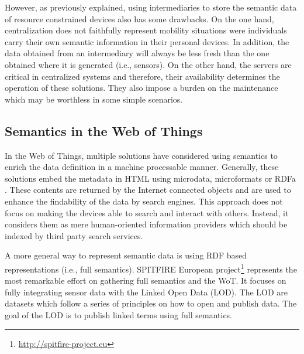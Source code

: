 However, as previously explained, using intermediaries to store the semantic data of resource constrained devices also has some drawbacks.
On the one hand, centralization does not faithfully represent mobility situations were individuals carry their own semantic information in their personal devices.
In addition, the data obtained from an intermediary will always be less fresh than the one obtained where it is generated (i.e., sensors).
On the other hand, the servers are critical in centralized systems and therefore, their availability determines the operation of these solutions.
They also impose a burden on the maintenance which may be worthless in some simple scenarios.


\subsection{Semantics in the Web of Things}
In the Web of Things, multiple solutions have considered using semantics to enrich the data definition in a machine processable manner.
Generally, these solutions embed the metadata in HTML using microdata, microformats or RDFa \citep{mayer_extensible_2011}.
These contents are returned by the Internet connected objects and are used to enhance the findability of the data by search engines.
This approach does not focus on making the devices able to search and interact with others.
Instead, it considers them as mere human-oriented information providers which should be indexed by third party search services.

A more general way to represent semantic data is using RDF based representations (i.e., full semantics).
SPITFIRE European project\footnote{\url{http://spitfire-project.eu}} represents the most remarkable effort on gathering full semantics and the WoT.
It focuses on fully integrating sensor data with the Linked Open Data (LOD). 
The LOD are datasets which follow a series of principles on how to open and publish data.
The goal of the LOD is to publish linked terms using full semantics.

